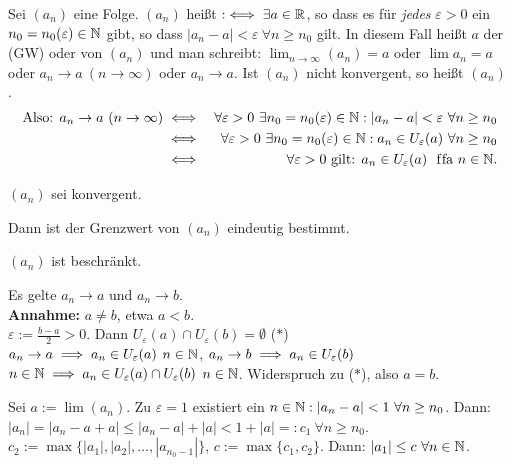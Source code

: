 \documentclass[a4paper,twoside,DIV15,BCOR12mm]{scrbook}
\begin{document}
\begin{definition}
Sei $(a_n)$ eine Folge. $(a_n)$ heißt  $:\iff \exists a \in \mathbb{R}$, so dass es für \textit{jedes} $\varepsilon > 0$ ein $n_0 = n_0(\varepsilon) \in \mathbb{N}$ gibt, so dass $|a_n - a| < \varepsilon \ \forall n \ge n_0$ gilt. In diesem Fall heißt $a$ der  (GW) oder  von $(a_n)$ und man schreibt: $\lim_{n \to \infty}(a_n) = a$ oder $\lim{a_n} = a$ oder $a_n \to a \ (n \to \infty)$ oder $a_n \to a$. Ist $(a_n)$ nicht konvergent, so heißt $(a_n)$ .
\begin{eqnarray*}
\text{Also: } a_n \to a \ (n \to \infty) 
  &\iff& \forall\varepsilon > 0 \ \exists n_0 = n_0(\varepsilon) \in\mathbb{N}: |a_n - a| < \varepsilon \ \forall n \ge n_0 \\
  &\iff& \forall\varepsilon > 0 \ \exists n_0 = n_0(\varepsilon) \in\mathbb{N}: a_n \in U_{\varepsilon}(a)\ \forall n \ge n_0 \\
  &\iff& \forall\varepsilon > 0 \text{ gilt: } a_n \in U_\varepsilon(a) \text{ \text{ f\/fa }} n \in \mathbb{N}.
\end{eqnarray*}
\end{definition}

\begin{satz}
$(a_n)$ sei konvergent.
\begin{liste}
\item Dann ist der Grenzwert von $(a_n)$ eindeutig bestimmt.
\item $(a_n)$ ist beschränkt.
\end{liste}
\end{satz}

\begin{beweise}
\item Es gelte $a_n \to a$ und $a_n \to b$. \\
\textbf{Annahme:} $a \ne b$, etwa $a < b$.\\
$\varepsilon := \frac{b-a}2 > 0$. Dann $U_\varepsilon(a) \cap U_\varepsilon(b) = \emptyset$ ($*$)\\
$a_n \to a \implies a_n \in U_\varepsilon(a) $ \ffa  $n \in \mathbb{N}$, $a_n \to b \implies a_n \in U_\varepsilon(b)$ \ffa $n \in \mathbb{N} \implies a_n \in U_\varepsilon(a) \cap U_\varepsilon(b)$ \ffa $n\in\mathbb{N}$. Widerspruch zu ($*$), also $a = b$.
\item Sei $a := \lim(a_n)$. Zu $\varepsilon = 1$ existiert ein $n\in\MdN: |a_n - a | < 1\ \forall n\ge n_0$. Dann: $|a_n| = |a_n - a + a| \le |a_n -a| + |a| < 1 + |a| =: c_1 \ \forall n \ge n_0$. $c_2 := \max\{|a_1|,|a_2|,\ldots,|a_{n_0-1}|\}$, $c := \max\{c_1,c_2\}$. Dann: $|a_1| \le c \ \forall n\in\mathbb{N}$.
\end{beweise}
\end{document}
